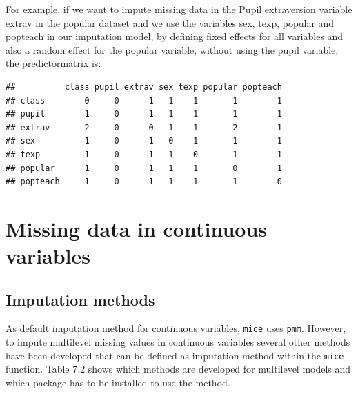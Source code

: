 \documentclass[
]{book}
\begin{document}
For example, if we want to impute missing data in the Pupil extraversion variable extrav in the popular dataset and we use the variables sex, texp, popular and popteach in our imputation model, by defining fixed effects for all variables and also a random effect for the popular variable, without using the pupil variable, the predictormatrix is:

\begin{verbatim}
##          class pupil extrav sex texp popular popteach
## class        0     0      1   1    1       1        1
## pupil        1     0      1   1    1       1        1
## extrav      -2     0      0   1    1       2        1
## sex          1     0      1   0    1       1        1
## texp         1     0      1   1    0       1        1
## popular      1     0      1   1    1       0        1
## popteach     1     0      1   1    1       1        0
\end{verbatim}

\hypertarget{missing-data-in-continuous-variables}{%
\section{Missing data in continuous variables}\label{missing-data-in-continuous-variables}}

\hypertarget{imputation-methods}{%
\subsection{Imputation methods}\label{imputation-methods}}

As default imputation method for continuous variables, \texttt{mice} uses \texttt{pmm}. However, to impute multilevel missing values in continuous variables several other methods have been developed that can be defined as imputation method within the \texttt{mice} function. Table 7.2 shows which methods are developed for multilevel models and which package has to be installed to use the method.
\end{document}
